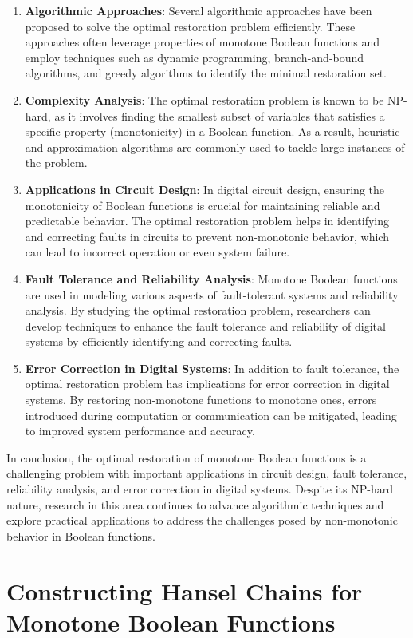 \documentclass{article}
\renewcommand{\_}{\ifincsname_\else\legacyunderscore\fi}
\begin{document}
\begin{enumerate}
    \item \textbf{Algorithmic Approaches}: Several algorithmic approaches have been proposed to solve the optimal restoration problem efficiently. These approaches often leverage properties of monotone Boolean functions and employ techniques such as dynamic programming, branch-and-bound algorithms, and greedy algorithms to identify the minimal restoration set.
    
    \item \textbf{Complexity Analysis}: The optimal restoration problem is known to be NP-hard, as it involves finding the smallest subset of variables that satisfies a specific property (monotonicity) in a Boolean function. As a result, heuristic and approximation algorithms are commonly used to tackle large instances of the problem.
    
    \item \textbf{Applications in Circuit Design}: In digital circuit design, ensuring the monotonicity of Boolean functions is crucial for maintaining reliable and predictable behavior. The optimal restoration problem helps in identifying and correcting faults in circuits to prevent non-monotonic behavior, which can lead to incorrect operation or even system failure.
    
    \item \textbf{Fault Tolerance and Reliability Analysis}: Monotone Boolean functions are used in modeling various aspects of fault-tolerant systems and reliability analysis. By studying the optimal restoration problem, researchers can develop techniques to enhance the fault tolerance and reliability of digital systems by efficiently identifying and correcting faults.
    
    \item \textbf{Error Correction in Digital Systems}: In addition to fault tolerance, the optimal restoration problem has implications for error correction in digital systems. By restoring non-monotone functions to monotone ones, errors introduced during computation or communication can be mitigated, leading to improved system performance and accuracy.
\end{enumerate}

In conclusion, the optimal restoration of monotone Boolean functions is a challenging problem with important applications in circuit design, fault tolerance, reliability analysis, and error correction in digital systems. Despite its NP-hard nature, research in this area continues to advance algorithmic techniques and explore practical applications to address the challenges posed by non-monotonic behavior in Boolean functions.



\section*{Constructing Hansel Chains for Monotone Boolean Functions}
\end{document}
